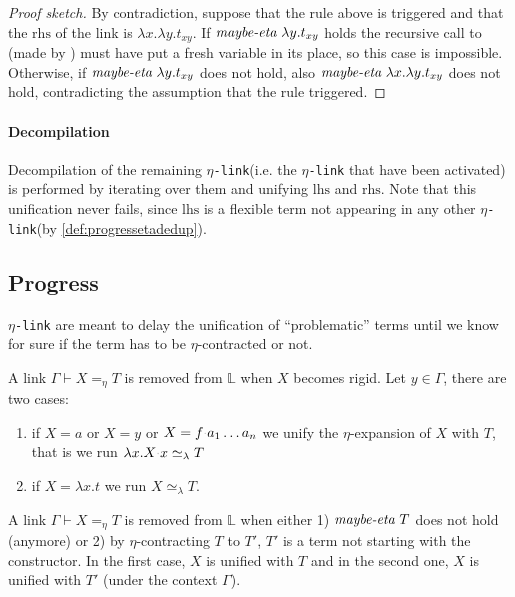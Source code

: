 \documentclass[sigconf,natbib=false,review]{acmart}
\newcommand{\appsep}{\ensuremath{\textcolor{lightgray}{\cdot}}}
\newcommand{\UnifRel}{\ensuremath{\simeq}}
\newcommand{\Ue}{\ensuremath{\UnifRel_\lambda}\xspace}
\newcommand{\linkMacro}[1]{\ensuremath{#1}\texttt{-link}\xspace}
\newcommand{\linketa} {\linkMacro{\eta}}
\newcommand{\linketaM}[3]{\ensuremath{#1 \vdash #2 =_\eta #3}}
\newcommand{\lhs}{\ensuremath{\mathrm{lhs}}\xspace}
\newcommand{\rhs}{\ensuremath{\mathrm{rhs}}\xspace}
\newcommand{\linkStore}{\ensuremath{\mathbb{L}}\xspace}
\begin{document}
\begin{proof}[Proof sketch]
  By contradiction, suppose that the rule above is triggered and that
  the \rhs of the link is $\lambda x.\lambda y.t_{xy}$.
  If $\emph{maybe-eta}{}~\lambda y.t_{xy}$ holds the recursive call to
   (made by ) must have put a fresh variable
  in its place, so this case is impossible.
  Otherwise, if $\emph{maybe-eta}{}~\lambda y.t_{xy}$ does not hold, also
  $\emph{maybe-eta}{}~\lambda x.\lambda y.t_{xy}$ does not hold, contradicting
  the assumption that the rule triggered.
\end{proof}

\paragraph{Decompilation}
Decompilation of the remaining \linketa (i.e. the \linketa that have been
activated) is performed by iterating over them and unifying \lhs and \rhs. Note
that this unification never fails, since \lhs is a flexible term not appearing
in any other \linketa (by \cref{def:progressetadedup}).

\subsection{Progress}\label{sec:etaprogress}

\linketa are meant to delay the unification of ``problematic'' terms until
we know for sure if the term has to be $\eta$-contracted or not.

\newcommand{\progressetaleft}{\emph{progress-$\eta$-left}\xspace}
\begin{definition}[\progressetaleft]\label{def:progressetaleft}
A link \linketaM{\Gamma}{X}{T} is removed from \linkStore when
$X$ becomes rigid. Let $y\in\Gamma$, there are two cases:
\begin{enumerate}
  \item if $X = a$ or $X = y$ or $X = f \appsep a_1\ldots a_n$
    we unify the $\eta$-expansion of $X$ with $T$, that is we run
    $\lambda x.X \appsep x\Ue{} T$
    \item if $X = \lambda x.t$ we run $X \Ue{} T$.
\end{enumerate}
\end{definition}

\newcommand{\progressetaright}{\emph{progress-$\eta$-right}\xspace}
\begin{definition}[\progressetaright]\label{def:progressetaright} A link
\linketaM{\Gamma}{X}{T} is removed from \linkStore when either 1)
$\emph{maybe-eta}~T$ does not hold (anymore) or 2) by $\eta$-contracting $T$ to
$T'$, $T'$ is a term not starting with the  constructor. In the
first case, $X$ is unified with $T$ and in the second one, $X$ is unified with
$T'$ (under the context $\Gamma$).
\end{definition}
\end{document}

